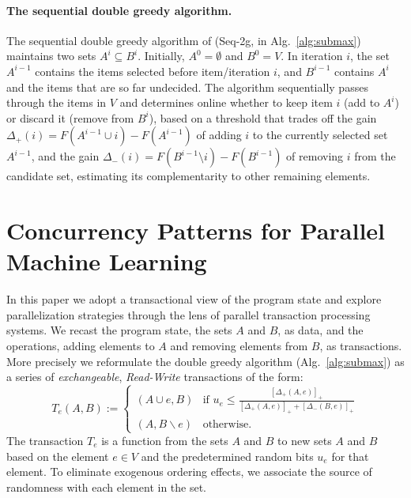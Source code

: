 \documentclass{article} %
\newcommand{\seqalg}{Seq-2g}
\newcommand{\algref}[1]{Alg.~\ref{#1}}
\newcommand{\hinge}[1]{\left[  #1 \right]_+}
\newcommand{\union}{\cup}
\begin{document}
\paragraph{The sequential double greedy algorithm.}
The sequential double greedy algorithm of \citet{buchbinder2012} (\seqalg{}, in \algref{alg:submax}) maintains two sets $A^i \subseteq B^i$.
Initially, $A^0 = \emptyset$ and $B^0 = V$.
In iteration $i$, the set $A^{i-1}$ contains the items selected before item/iteration $i$, and $B^{i-1}$ contains $A^i$ and the items that are so far undecided.
The algorithm sequentially passes through the items in $V$ and determines online whether to keep item $i$ (add to $A^i$) or discard it (remove from $B^i$), based on a threshold that trades off the gain $\Delta_+(i) = F(A^{i-1} \union i) - F(A^{i-1})$ of adding $i$ to the currently selected set $A^{i-1}$, and the gain $\Delta_-(i) = F(B^{i-1}\setminus i) - F(B^{i-1})$ of removing $i$ from the candidate set, estimating its complementarity to other remaining elements.









\section{Concurrency Patterns for Parallel Machine Learning \label{sec:concurrencycontrol}}

In this paper we adopt a transactional view of the program state and explore parallelization strategies through the lens of parallel transaction processing systems.
We recast the program state, the sets $A$ and $B$, as data, and the operations, adding elements to $A$ and removing elements from $B$, as transactions.
More precisely we reformulate the double greedy algorithm (\algref{alg:submax}) as a series of \emph{exchangeable}, \emph{Read-Write} transactions of the form:
\begin{equation}
T_e(A,B) :=
\begin{cases}
   (A \union e, B) & \text{if } u_e \leq \frac{\hinge{\Delta_+(A,e)}}{ \hinge{\Delta_+(A,e)} + \hinge{\Delta_-(B,e)}}  \\
   (A, B \backslash e) & \text{otherwise. }
  \end{cases}
  \label{eqn:greedytransaction}
\end{equation}
The transaction $T_e$ is a function from the sets $A$ and $B$ to new sets $A$ and $B$ based on the element $e \in V$ and the predetermined random bits $u_e$ for that element.
To eliminate exogenous ordering effects, we associate the source of randomness with each element in the set.
\end{document}
